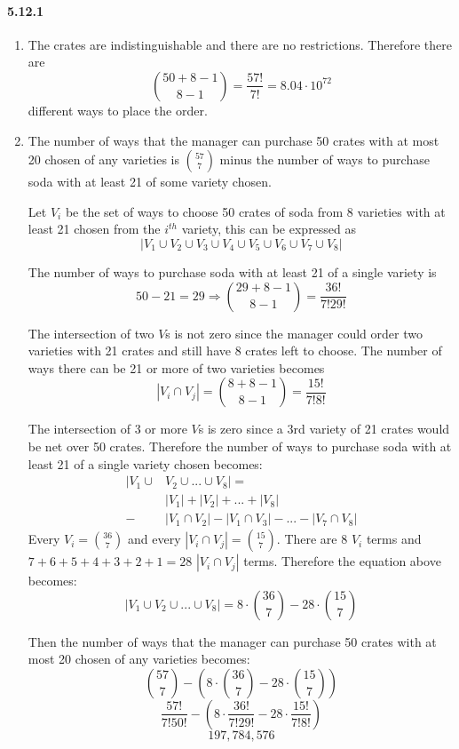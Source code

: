 \documentclass[11pt, letterpaper, twocolumn, fleqn]{article}
\begin{document}
\paragraph{5.12.1}
\begin{enumerate}
  \item The crates are indistinguishable and there are no restrictions. Therefore there are 
    $$\binom{50+8-1}{8-1} = \frac{57!}{7!} = 8.04\cdot10^{72}$$
  different ways to place the order.
  \item The number of ways that the manager can purchase 50 crates with at most 20 chosen of any varieties is $\binom{57}{7}$ minus the number of ways to purchase soda with at least 21 of some variety chosen.
  
  Let $V_i$ be the set of ways to choose 50 crates of soda from 8 varieties with at least 21 chosen from the $i^{th}$ variety, this can be expressed as 
    $$|V_1 \cup V_2 \cup V_3 \cup V_4 \cup V_5 \cup V_6 \cup V_7 \cup V_8 |$$
    
  The number of ways to purchase soda with at least 21 of a single variety is 
    $$50-21 = 29 \Rightarrow \binom{29+8-1}{8-1} = \frac{36!}{7!29!}$$
  
  The intersection of two $V$s is not zero since the manager could order two varieties with 21 crates and still have 8 crates left to choose. The number of ways there can be 21 or more of two varieties becomes 
    $$|V_i \cap V_j| = \binom{8+8-1}{8-1} = \frac{15!}{7!8!}$$
  
  The intersection of 3 or more $V$s is zero since a 3rd variety of 21 crates would be net over 50 crates. Therefore the number of ways to purchase soda with at least 21 of a single variety chosen becomes:
  \begin{align*}
    |V_1 \cup &V_2 \cup... \cup V_8 | =        \\
              &|V_1| + |V_2| + ... +|V_8|   \\
              - &|V_1 \cap V_2| - |V_1 \cap V_3|- ... -|V_7 \cap V_8|
  \end{align*}
  Every $V_i = \binom{36}{7}$ and every $|V_i \cap V_j| = \binom{15}{7}$. There are 8 $V_i$ terms and $7+6+5+4+3+2+1 = 28 $ $|V_i \cap V_j|$ terms. Therefore the equation above becomes:
    $$|V_1 \cup V_2 \cup... \cup V_8 | = 8 \cdot \binom{36}{7} - 28 \cdot \binom{15}{7} $$
  
  Then the number of ways that the manager can purchase 50 crates with at most 20 chosen of any varieties becomes:
    $$\binom{57}{7} - \left(8 \cdot \binom{36}{7} - 28 \cdot \binom{15}{7} \right)$$
    $$\frac{57!}{7!50!} - \left(8 \cdot \frac{36!}{7!29!} - 28 \cdot \frac{15!}{7!8!} \right)$$
    $$197,784,576$$
  
\end{enumerate}
\end{document}
